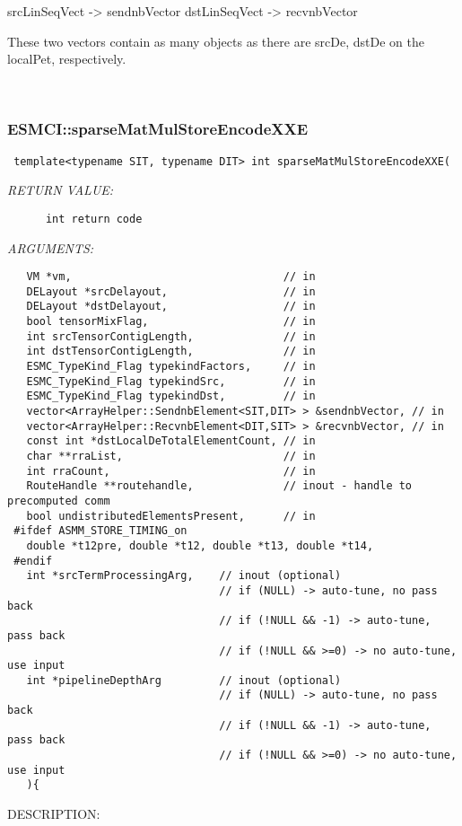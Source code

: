         srcLinSeqVect -> sendnbVector
        dstLinSeqVect -> recvnbVector
  
      These two vectors contain as many objects as there are srcDe, dstDe on
      the localPet, respectively.
   
 
\mbox{}\hrulefill\
 
\subsubsection [ESMCI::sparseMatMulStoreEncodeXXE] {ESMCI::sparseMatMulStoreEncodeXXE}


  
\begin{verbatim} template<typename SIT, typename DIT> int sparseMatMulStoreEncodeXXE(\end{verbatim}{\em RETURN VALUE:}
\begin{verbatim}      int return code\end{verbatim}{\em ARGUMENTS:}
\begin{verbatim}   VM *vm,                                 // in
   DELayout *srcDelayout,                  // in
   DELayout *dstDelayout,                  // in
   bool tensorMixFlag,                     // in
   int srcTensorContigLength,              // in
   int dstTensorContigLength,              // in
   ESMC_TypeKind_Flag typekindFactors,     // in
   ESMC_TypeKind_Flag typekindSrc,         // in
   ESMC_TypeKind_Flag typekindDst,         // in
   vector<ArrayHelper::SendnbElement<SIT,DIT> > &sendnbVector, // in
   vector<ArrayHelper::RecvnbElement<DIT,SIT> > &recvnbVector, // in
   const int *dstLocalDeTotalElementCount, // in
   char **rraList,                         // in
   int rraCount,                           // in
   RouteHandle **routehandle,              // inout - handle to precomputed comm
   bool undistributedElementsPresent,      // in
 #ifdef ASMM_STORE_TIMING_on
   double *t12pre, double *t12, double *t13, double *t14,
 #endif
   int *srcTermProcessingArg,    // inout (optional)
                                 // if (NULL) -> auto-tune, no pass back
                                 // if (!NULL && -1) -> auto-tune, pass back
                                 // if (!NULL && >=0) -> no auto-tune, use input
   int *pipelineDepthArg         // inout (optional)
                                 // if (NULL) -> auto-tune, no pass back
                                 // if (!NULL && -1) -> auto-tune, pass back
                                 // if (!NULL && >=0) -> no auto-tune, use input
   ){\end{verbatim}
{\sf DESCRIPTION:\\ }


